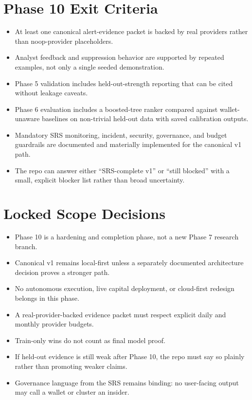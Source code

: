 \documentclass{article}
\begin{document}
\section*{Phase 10 Exit Criteria}
\begin{itemize}
\item At least one canonical alert-evidence packet is backed by real providers rather than noop-provider placeholders.
\item Analyst feedback and suppression behavior are supported by repeated examples, not only a single seeded demonstration.
\item Phase 5 validation includes held-out-strength reporting that can be cited without leakage caveats.
\item Phase 6 evaluation includes a boosted-tree ranker compared against wallet-unaware baselines on non-trivial held-out data with saved calibration outputs.
\item Mandatory SRS monitoring, incident, security, governance, and budget guardrails are documented and materially implemented for the canonical v1 path.
\item The repo can answer either ``SRS-complete v1'' or ``still blocked'' with a small, explicit blocker list rather than broad uncertainty.
\end{itemize}

\section*{Locked Scope Decisions}
\begin{itemize}
\item Phase 10 is a hardening and completion phase, not a new Phase 7 research branch.
\item Canonical v1 remains local-first unless a separately documented architecture decision proves a stronger path.
\item No autonomous execution, live capital deployment, or cloud-first redesign belongs in this phase.
\item A real-provider-backed evidence packet must respect explicit daily and monthly provider budgets.
\item Train-only wins do not count as final model proof.
\item If held-out evidence is still weak after Phase 10, the repo must say so plainly rather than promoting weaker claims.
\item Governance language from the SRS remains binding: no user-facing output may call a wallet or cluster an insider.
\end{itemize}
\end{document}

